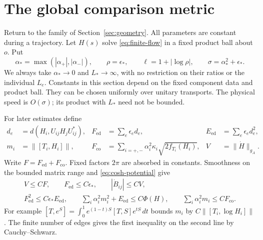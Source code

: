 \section{The global comparison metric}\label{sec:reconstruction}

Return to the family of Section~\ref{sec:geometry}. All parameters
are constant during a trajectory. Let $H(s)$ solve
\eqref{eq:finite-flow} in a fixed product ball about $o$. Put
\begin{equation}\label{eq:small-parameters}
 \alpha_* =\max(|\alpha_+|,|\alpha_-|),\qquad
 \rho=\epsilon_*,\qquad \ell=1+|\log\rho|,\qquad
 \sigma=\alpha_*^2+\epsilon_*.
\end{equation}
We always take $\alpha_*\to0$ and $L_*\to\infty$, with no
restriction on their ratios or the individual $L_e$. Constants in
this section depend on the fixed component data and product ball.
They can be chosen uniformly over unitary transports. The physical
speed is $O(\sigma)$; its product with $L_*$ need not be bounded.

For later estimates define
\begin{align}
 d_e&=d(H_i,U_{ij}H_jU_{ij}^*),&
 F_{\mathrm{ed}}&=\sum_e\epsilon_e d_e,&
 E_{\mathrm{ed}}&=\sum_e\epsilon_e d_e^2,\label{eq:edge-quantities}\\
 m_i&=\|[T_i,H_i]\|,&
 F_{\mathrm{co}}&=\sum_{i=+,-}\alpha_i^2\kappa_i
                            \sqrt{2f_{T_i}(H_i)},&
 V&=\|\dot H\|_{g_A}.\label{eq:component-quantities}
\end{align}
Write $F=F_{\mathrm{ed}}+F_{\mathrm{co}}$. Fixed factors $2\pi$
are absorbed in constants. Smoothness on the bounded matrix range and
\eqref{eq:cosh-potential} give
\begin{equation}\label{eq:force-energy-relations}
 \begin{gathered}
 V\le CF,\qquad F_{\mathrm{ed}}\le C\epsilon_*,
 \qquad |\dot B_{ij}|\le CV,\\
 F_{\mathrm{ed}}^2\le C\epsilon_*E_{\mathrm{ed}},\qquad
 \sum_i\alpha_i^2m_i^2+E_{\mathrm{ed}}\le C\Phi(H),
 \qquad \sum_i\alpha_i^2m_i\le CF_{\mathrm{co}}.
 \end{gathered}
\end{equation}
For example $[T,e^S]=\int_0^1e^{(1-t)S}[T,S]e^{tS}\,dt$
bounds $m_i$ by $C\|[T_i,\log H_i]\|$. The finite number of
edges gives the first inequality on the second line by
Cauchy--Schwarz.


